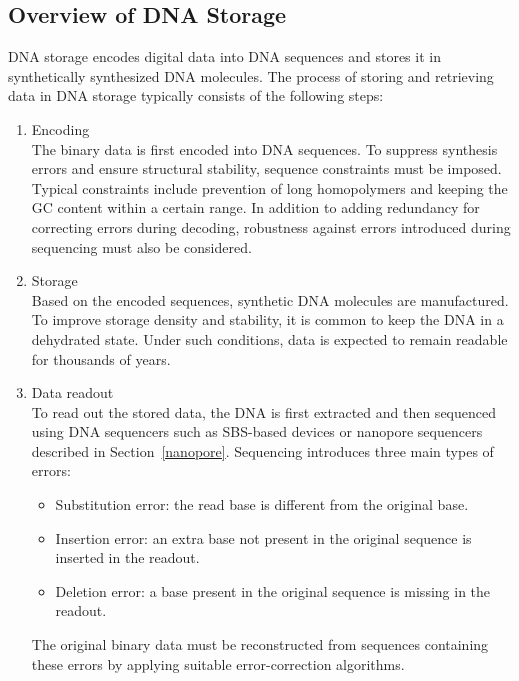 \documentclass[sotsuron]{kuee}
\begin{document}
\subsection{Overview of DNA Storage} \label{dna_storage}
DNA storage encodes digital data into DNA sequences and stores it in synthetically synthesized DNA molecules.
The process of storing and retrieving data in DNA storage typically consists of the following steps:
\begin{enumerate}
  \item Encoding\\
  The binary data is first encoded into DNA sequences.
  To suppress synthesis errors and ensure structural stability, sequence constraints must be imposed.
  Typical constraints include prevention of long homopolymers and keeping the GC content within a certain range\cite{Gervasio}.
  In addition to adding redundancy for correcting errors during decoding, robustness against errors introduced
  during sequencing must also be considered.
  \item Storage\\
  Based on the encoded sequences, synthetic DNA molecules are manufactured.
  To improve storage density and stability, it is common to keep the DNA in a dehydrated state\cite{landsman2023the}.
  Under such conditions, data is expected to remain readable for thousands of years\cite{Grass2015Robust}.
  \item Data readout\\
  To read out the stored data, the DNA is first extracted and then sequenced using DNA sequencers such as
  SBS-based devices or nanopore sequencers described in Section~\ref{nanopore}.
  Sequencing introduces three main types of errors:
  \begin{itemize}
    \item Substitution error: the read base is different from the original base.
    \item Insertion error: an extra base not present in the original sequence is inserted in the readout.
    \item Deletion error: a base present in the original sequence is missing in the readout.
  \end{itemize}
  The original binary data must be reconstructed from sequences containing these errors by applying
  suitable error-correction algorithms.
\end{enumerate}
\end{document}
